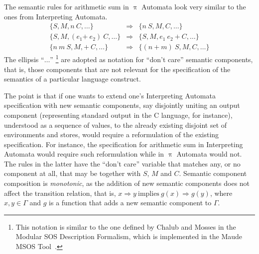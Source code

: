 \documentclass[a4paper,openany]{book}
\begin{document}
The semantic rules for arithmetic sum in $\uppi$ Automata look
very similar to the ones from Interpreting Automata. %
\begin{eqnarray}
\label{eq:gia-val} \{ S, M, n~ C, \ldots \} & \Rightarrow & \{ n ~ S, M, C, \ldots \} \\
\label{eq:gia-add1}\{ S, M, (e_1 \mathtt{+}~ e_2) ~ C, \ldots \} & \Rightarrow &
\label{eq:gia-add2}\{ S, M, e_1 ~ e_2 ~ \mathtt{+}~ C, \ldots \} \\
\{ n ~ m ~ S, M, \mathtt{+}~ C , \ldots \} & \Rightarrow & \{ (n + m)~
S, M, C, \ldots \}
\end{eqnarray}
The ellipsis ``$\ldots$'' \footnote{This notation is similar to the one defined by
  Chalub and Mosses in the Modular SOS Description Formalism, which is
  implemented in the Maude MSOS Tool~\cite{wrla06}.} are adopted as notation for
``don't care'' semantic components, that is, those components that are
not relevant for the specification of the semantics of a particular
language construct.

The point is that if one wants to extend one's Interpreting Automata specification with new
semantic components, say disjointly uniting an output component (representing standard output in the C language, for instance), understood as a
sequence of values, to the already existing disjoint set of
environments and stores, would require a reformulation of the existing
specification. For instance, the specification for arithmetic sum in Interpreting Automata 
would require such reformulation while in $\uppi$ Automata would not. %
The rules in the latter have
the ``don't care'' variable that matches any, or no component at all,
that may be together with $S$, $M$ and $C$. 
Semantic component
composition is \emph{monotonic}, as the addition of new semantic
components does not affect the transition relation, that is, $x
\Rightarrow y ~\mbox{implies}~ g(x) \Rightarrow g(y)$, where $x, y \in \Gamma$
and $g$ is a function that adds a new semantic component to $\Gamma$.
%
\end{document}
